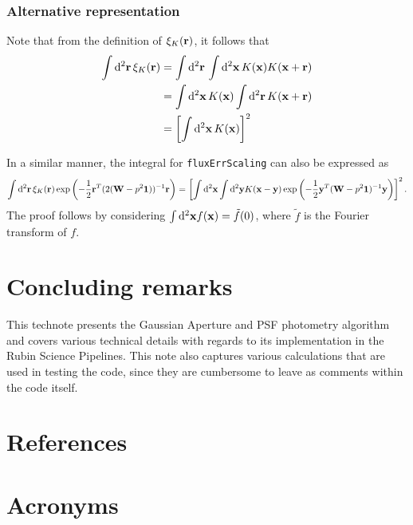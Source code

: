 \documentclass[DM,lsstdraft, authoryear,toc]{lsstdoc}
\newcommand{\rmd}{\mathrm{d}^2}
\begin{document}
\subsubsection{Alternative representation}
Note that from the definition of $\xi_K({\bf r})$, it follows that
\begin{align}
  \int\rmd{\bf r}\, \xi_K({\bf r}) &= \int\rmd{\bf r}\, \int\rmd{\bf x}\, K({\bf x})K({\bf x}+{\bf r})\\
                                   &= \int\rmd{\bf x}\, K({\bf x}) \int\rmd{\bf r}\, K({\bf x}+{\bf r})\\
                                   &= \left[ \int\rmd{\bf x}\, K({\bf x})\right]^2
                                   \label{eq:integral_acf}
\end{align}

In a similar manner, the integral for \texttt{fluxErrScaling} can also be expressed as
\begin{equation}
  \int\rmd {\bf r}\, \xi_{K}({\bf r}) \exp\left(-\frac{1}{2}{\bf r}^T(2({\bf W}-p^2{\bf 1}))^{-1}{\bf r}\right) =
  \left[ \int\rmd{\bf x}\int\rmd{\bf y} K({\bf x}-{\bf y}) \exp\left(-\frac{1}{2}{\bf y}^T({\bf W}-p^2{\bf 1})^{-1}{\bf y}\right)\right]^2.
\end{equation}
The proof follows by considering $\int\rmd{\bf x} f({\bf x}) = \tilde{f}(0)$, where $\tilde{f}$ is the Fourier transform of $f$.

\section{Concluding remarks}
This technote presents the Gaussian Aperture and PSF photometry algorithm and covers various technical details with regards to its implementation in the Rubin Science Pipelines.
This note also captures various calculations that are used in testing the code, since they are cumbersome to leave as comments within the code itself.

\appendix
\section{References} \label{sec:bib}
\renewcommand{\refname}{} %


\section{Acronyms} \label{sec:acronyms}

\end{document}
